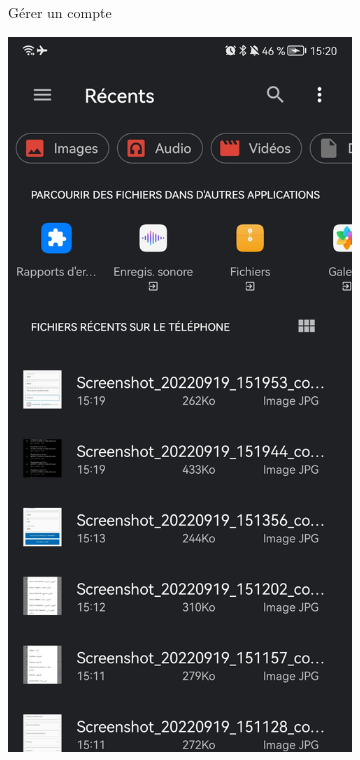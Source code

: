 \begin{itemize}[label=$\ast$]
\begin{figure}
\begin{subfigure}[b]{0.3\textwidth}
		\caption{Gérer un compte}
		\label{fig:three sin x}
	\end{subfigure}
	\hfill
	\begin{subfigure}[b]{0.3\textwidth}
		\centering
		\includegraphics[width=\textwidth]{./Template LaTeX/Images/8.jpg}

\end{subfigure}
\end{figure}
\end{itemize}
